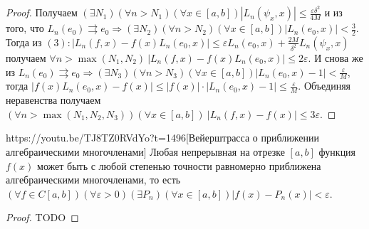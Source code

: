 \begin{proof}
Получаем $(\exists N_1)(\forall n > N_1)(\forall x\in [a,b]) |L_n(\psi_x,x)|\leqslant\frac{\varepsilon\delta^2}{4M}$ и из того, что $L_n(e_0)\rightrightarrows  e_0\Rightarrow (\exists N_2)(\forall n > N_2)(\forall x\in [a,b]) |L_n(e_0,x)|<\frac{3}{2}$. Тогда из $(3): |L_n(f,x)-f(x)L_n(e_0,x)|\leqslant\varepsilon L_n(e_0,x)+\frac{2M}{\delta^2}L_n(\psi_x,x)$ получаем $\forall n > \max(N_1, N_2)\  |L_n(f,x)-f(x)L_n(e_0, x)|\leqslant 2\varepsilon$. И снова же из $L_n(e_0)\rightrightarrows e_0\Rightarrow(\exists N_3)(\forall n>N_3)(\forall x\in [a,b]) |L_n(e_0, x)-1|<\frac{\varepsilon}{M}$, тогда $|f(x)L_n(e_0, x)-f(x)|\leqslant
|f(x)|\cdot|L_n(e_0,x)-1|\leqslant\frac{\varepsilon}{M}$. Объединяя неравенства получаем $(\forall n > \max(N_1, N_2, N_3))(\forall x\in [a,b])\ |L_n(f,x)-f(x)|\leqslant 3\varepsilon$.
\end{proof}

\begin{linkthm}{https://youtu.be/TJ8TZ0RVdYo?t=1496}[Вейерштрасса о приближении алгебраическими многочленами]
Любая непрерывная на отрезке $[a,b]$ функция $f(x)$ может быть с любой степенью точности равномерно приближена алгебраическими многочленами, то есть $(\forall f\in C[a,b])(\forall\varepsilon>0)(\exists P_n)(\forall x\in[a,b])|f(x)-P_n(x)|<\varepsilon$.
\end{linkthm}
\begin{proof}
TODO
\end{proof}





































